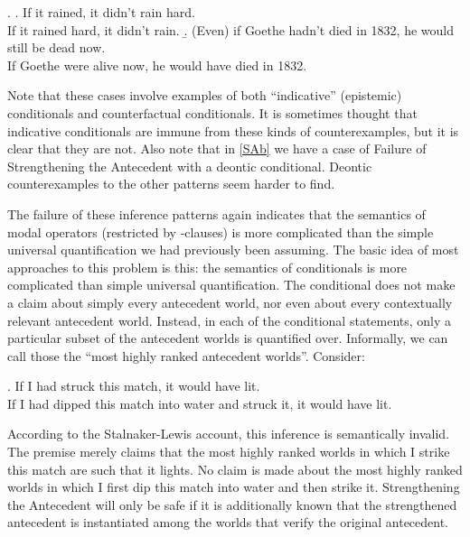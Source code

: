 \ex.  \a. If it rained, it didn't rain hard.\\
If it rained hard, it didn't rain. \b. (Even) if Goethe hadn't died in 1832, he would still be dead now.\\
If Goethe were alive now, he would have died in 1832. 

Note that these cases involve examples of both ``indicative'' (epistemic) conditionals and counterfactual conditionals. It is sometimes thought that indicative conditionals are immune from these kinds of counterexamples, but it is clear that they are not. Also note that in \ref{SAb} we have a case of Failure of Strengthening the Antecedent with a deontic conditional. Deontic counterexamples to the other patterns seem harder to find.

The failure of these inference patterns again indicates that the semantics of modal operators (restricted by -clauses) is more complicated than the simple universal quantification we had previously been assuming. The basic idea of most approaches to this problem is this: the semantics of conditionals is more complicated than simple universal quantification. The conditional does not make a claim about simply every antecedent world, nor even about every contextually relevant antecedent world. Instead, in each of the conditional statements, only a particular subset of the antecedent worlds is quantified over. Informally, we can call those the ``most highly ranked antecedent worlds''. Consider:

\ex. If I had struck this match, it would have lit.\\
If I had dipped this match into water and struck it, it would have lit.

According to the Stalnaker-Lewis account, this inference is semantically invalid. The premise merely claims that the most highly ranked worlds in which I strike this match are such that it lights. No claim is made about the most highly ranked worlds in which I first dip this match into water and then strike it. Strengthening the Antecedent will only be safe if it is additionally known that the strengthened antecedent is instantiated among the worlds that verify the original antecedent.

